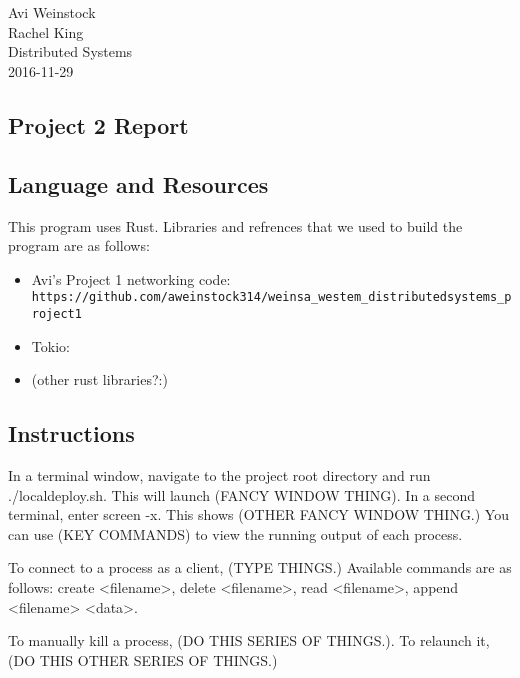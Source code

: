 \documentclass{article}
\begin{document}
\section*{}
Avi Weinstock \\
Rachel King \\
Distributed Systems\\
2016-11-29

\begin{center}
    \section*{Project 2 Report}
\end{center}

\subsection*{Language and Resources}
    This program uses Rust. Libraries and refrences that we used to build the program are as follows:
	\begin{itemize}
	    \item Avi's Project 1 networking code: \verb|https://github.com/aweinstock314/weinsa_westem_distributedsystems_project1|
	    \item Tokio:
	    \item (other rust libraries?:)
	\end{itemize}
\subsection*{Instructions}
    In a terminal window, navigate to the project root directory and run ./localdeploy.sh. This will launch (FANCY WINDOW THING). In a second terminal, enter screen -x. This shows (OTHER FANCY WINDOW THING.) You can use (KEY COMMANDS) to view the running output of each process.

    To connect to a process as a client, (TYPE THINGS.) Available commands are as follows: create <filename>, delete <filename>, read <filename>, append <filename> <data>.

    To manually kill a process, (DO THIS SERIES OF THINGS.). To relaunch it, (DO THIS OTHER SERIES OF THINGS.)
\end{document}
